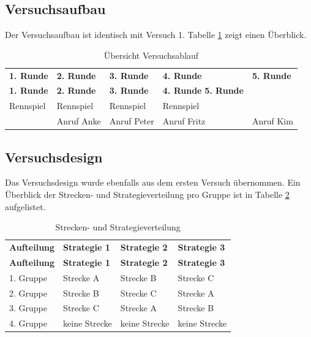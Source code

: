 \documentclass[12pt,a4paper]{scrartcl}
\begin{document}
\subsection{Versuchsaufbau}
Der Versuchsaufbau ist identisch mit Versuch 1.
Tabelle \ref{ablauf} zeigt einen Überblick.

\begin{longtable}{p{}p{}p{}p{}p{} }
	\label{ablauf}\\
	\caption[Übersicht Versuchsablauf]{Übersicht Versuchsablauf}\\
	\hline
	\textbf{1. Runde}&\textbf{2. Runde}&\textbf{3. Runde} &\textbf{4. Runde} & \textbf{5. Runde}\\
	\hline
	\endfirsthead
	\hline
	\textbf{1. Runde}&\textbf{2. Runde}&\textbf{3. Runde} &\textbf{4. Runde} \textbf{5. Runde}\\
	\hline
	\endhead
Rennspiel & Rennspiel & Rennspiel & Rennspiel &\\
 & Anruf Anke & Anruf Peter & Anruf Fritz & Anruf Kim \\
\hline
\end{longtable}

\subsection{Versuchsdesign}
Das Versuchsdesign wurde ebenfalls aus dem ersten Versuch übernommen.
Ein Überblick der Strecken- und Strategieverteilung pro Gruppe ist in Tabelle \ref{verteilung} aufgelistet. 

\begin{longtable}{p{3cm}p{3cm}p{3cm}p{3cm} }
	\label{verteilung}\\
	\caption[Strecken- und Strategieverteilung]{Strecken- und Strategieverteilung}\\
	\hline
	\textbf{Aufteilung}&\textbf{Strategie 1}&\textbf{Strategie 2} &\textbf{Strategie 3}\\
	\hline
	\endfirsthead
	\hline
	\textbf{Aufteilung}&\textbf{Strategie 1}&\textbf{Strategie 2} &\textbf{Strategie 3}\\
	\hline
	\endhead
1. Gruppe & Strecke A & Strecke B & Strecke C \\
2. Gruppe & Strecke B & Strecke C & Strecke A \\
3. Gruppe  & Strecke C & Strecke A & Strecke B \\
4. Gruppe   & keine Strecke & keine Strecke & keine Strecke\\ 
\hline
\end{longtable}
\end{document}
